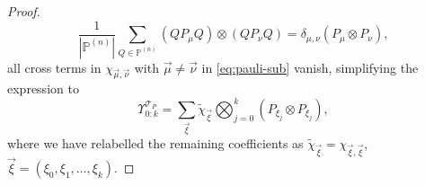 \begin{proof}
    \begin{equation}
        \frac{1}{|\mathbb{P}^{(n)}|}\sum_{Q\in\mathbb{P}^{(n)}} (Q P_{\mu} Q) \otimes (Q P_{\nu} Q) = \delta_{\mu,\nu} (P_{\mu} \otimes P_{\nu}),
    \end{equation}
    all cross terms in \(\chi_{\vec{\mu},\vec{\nu}}\) with \(\vec{\mu} \neq \vec{\nu}\) in \cref{eq:pauli-sub} vanish, simplifying the expression to
    \begin{equation}
        \Upsilon_{0:k}^{\mathcal{T}_P} = \sum_{\vec{\xi}} \tilde{\chi}_{\vec{\xi}} \bigotimes_{j=0}^k (P_{\xi_j} \otimes P_{\xi_j}),
    \end{equation}
    where we have relabelled the remaining coefficients as \(\tilde{\chi}_{\vec{\xi}} = \chi_{\vec{\xi},\vec{\xi}}\), \(\vec{\xi} = (\xi_0, \xi_1, \dots, \xi_k)\).


\end{proof}
